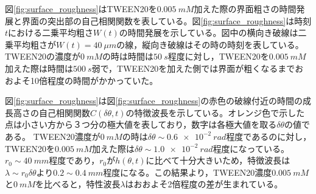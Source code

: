 \documentclass[autodetect-engine,dvi=dvipdfmx,a4paper,ja=standard,oneside,openany,11pt]{bxjsbook}
\begin{document}
図\ref{fig:surface_roughness}はTWEEN20を$\SI{0.005}{mM}$加えた際の界面粗さの時間発展と界面の突出部の自己相関関数を表している。図\ref{fig:surface_roughness}は時刻$t$における二乗平均粗さ$W(t)$の時間発展を示している。図中の横向き破線は二乗平均粗さが$W(t)=\SI{40}{\mu m}$の線，縦向き破線はその時の時刻を表している。TWEEN20の濃度が$\SI{0}{mM}$の時は時間は$\SI{50}{s}$程度に対し，TWEEN20を$\SI{0.005}{mM}$加えた際は時間は$\SI{500}{s}$弱で，TWEEN20を加えた側では界面が粗くなるまでおおよそ10倍程度の時間がかかっていた。

図\ref{fig:surface_roughness}は図\ref{fig:surface_roughness}の赤色の破線付近の時間の成長高さの自己相関関数$C(\delta\theta,t)$の特徴波長を示している。オレンジ色で示した点は小さい方から３つ分の極大値を表しており，数字は各極大値を取る$\delta \theta$の値である。
TWEEN20濃度が$\SI{0}{mM}$の時は$\delta\theta\sim\SI{0.6e-2}{rad}$程度であるのに対し，TWEEN20を$\SI{0.005}{mM}$加えた際は$\delta\theta\sim\SI{1.0e-2}{rad}$程度になっている。$r_0\sim\SI{40}{mm}$程度であり，$r_0$が$h(\theta,t)$に比べて十分大きいため，特徴波長は$\lambda\sim r_0\delta\theta$より$0.2\sim\SI{0.4}{mm}$程度になる。この結果より，TWEEN20濃度$\SI{0.005}{mM}$と$\SI{0}{mM}$を比べると，特性波長$\lambda$はおおよそ2倍程度の差が生まれている。
\end{document}
